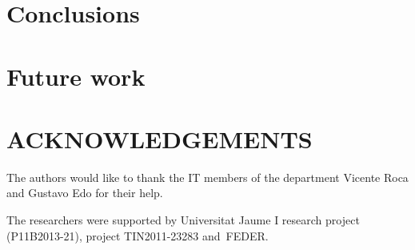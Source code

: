 \documentclass[a4paper,twoside]{article}
\begin{document}
\section{Conclusions}
\label{sec:conclusions}


\section{Future work}
\label{sec:future}


\section*{\uppercase{Acknowledgements}}
The authors would like to thank the IT members of the department Vicente Roca and Gustavo Edo for their help.

The researchers were supported by Universitat Jaume I research project (P11B2013-21), project
TIN2011-23283 and~FEDER.


{\small
}
\end{document}
